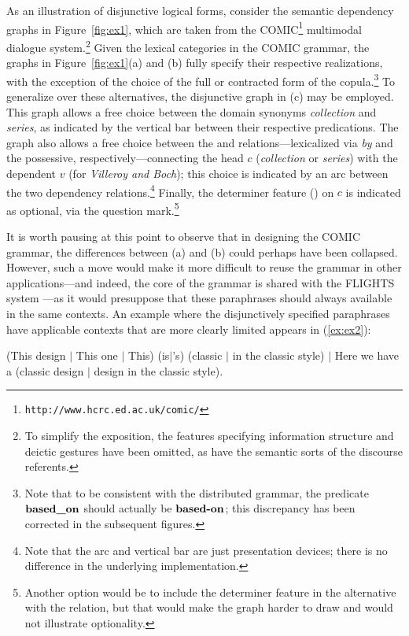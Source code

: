 \documentclass[11pt]{article}
\newcommand{\eref}[2][]{(\ref{ex:#2}#1)} %
\newcommand{\figref}[1]{Figure~\ref{fig:#1}} %
\begin{document}
As an illustration of disjunctive logical forms, consider the semantic
dependency graphs in \figref{ex1}, which are taken from the
COMIC\footnote{\texttt{http://www.hcrc.ed.ac.uk/comic/}} multimodal
dialogue system.\footnote{To simplify the exposition, the features
  specifying information structure and deictic gestures have been
  omitted, as have the semantic sorts of the discourse referents.}
Given the lexical categories in the COMIC grammar, the graphs in
\figref{ex1}(a) and (b) fully specify their respective realizations,
with the exception of the choice of the full or contracted form of the
copula.\footnote{Note that to be consistent with the distributed
  grammar, the predicate $\textbf{based\_on}$ should actually be
  $\textbf{based-on}$; this discrepancy has been corrected in the
  subsequent figures.} To generalize over these alternatives, the
disjunctive graph in (c) may be employed.  This graph allows a free
choice between the domain synonyms \textit{collection} and
\textit{series}, as indicated by the vertical bar between their
respective predications. The graph also allows a free choice between
the  and  relations---lexicalized via
\textit{by} and the possessive, respectively---connecting the head $c$
(\textit{collection} or \textit{series}) with the dependent $v$ (for
\textit{Villeroy and Boch}); this choice is indicated by an arc
between the two dependency relations.\footnote{Note that the arc and
  vertical bar are just presentation devices; there is no difference
  in the underlying implementation.} Finally, the determiner feature
() on $c$ is indicated as optional, via the
question mark.\footnote{Another option would be to include the
  determiner feature in the alternative with the 
  relation, but that would make the graph harder to draw and would not
  illustrate optionality.}

It is worth pausing at this point to observe that in designing the
COMIC grammar, the differences between (a) and (b) could perhaps have
been collapsed.  However, such a move would make it more difficult to
reuse the grammar in other applications---and indeed, the core of the
grammar is shared with the FLIGHTS system
\cite{FLIGHTS-FLAIRS:2004}---as it would presuppose that these
paraphrases should always available in the same contexts.  An example
where the disjunctively specified paraphrases have applicable contexts
that are more clearly limited appears in \eref{ex2}:

\begin{exe}
\ex \label{ex:ex2}
(This design $\mid$ This one $\mid$ This) (is$\mid$'s) (classic $\mid$
in the classic style) $\mid$ Here we have a (classic design $\mid$
design in the classic style).
\end{exe}
\end{document}
